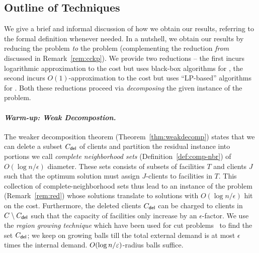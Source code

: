 %
%

\subsection{Outline of Techniques} \label{sec:overview}
We give a brief and informal discussion of how we obtain our results, referring to the formal definition whenever needed.
In a nutshell, we obtain our results by reducing the \mckc problem {\em to} the \cckp problem (complementing the reduction {\em from} discussed in Remark~\ref{rem:cckp}).
We provide two reductions -- the first incurs logarithmic approximation to the cost but uses black-box algorithms for \cckp, the second incurs $O(1)$-approximation to the cost but uses ``LP-based'' algorithms for \cckp.
Both these reductions proceed via {\em decomposing} the given instance of the \mckc problem. %

\paragraph{\emph{Warm-up: Weak Decompostion.}}
The weaker decomposition theorem (Theorem~\ref{thm:weakdecomp}) states that we can delete a subset $C_{\mathsf{del}}$ of clients and partition the residual instance into portions we call {\em complete neighborhood sets} (Definition~\ref{def:comp-nbr}) of $O(\log n/\epsilon)$ diameter.
These sets consists of subsets of facilities $T$ and clients $J$ such that the optimum solution must assign $J$-clients to facilities in $T$. This collection of complete-neighborhood sets thus lead to an instance of the \cckp problem (Remark~\ref{rem:red})
whose solutions translate to \mckc solutions with $O(\log n/\epsilon)$ hit on the cost. Furthermore, the deleted clients $C_{\mathsf{del}}$ can be charged to clients in $C\setminus C_{\mathsf{del}}$ such that the capacity of facilities only increase by an $\epsilon$-factor. 
We use the {\em region growing technique} which have been used for cut problems~\cite{Leighton Rao, GVY} to find the set $C_{\mathsf{del}}$; we keep on growing balls till the total external demand is at most $\epsilon$ times the internal demand.
$O(\log n/\varepsilon)$-radius balls suffice. %


